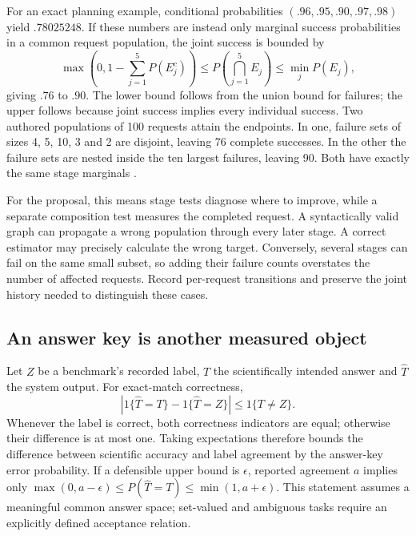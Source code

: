 For an exact planning example, conditional probabilities
$(.96,.95,.90,.97,.98)$ yield $.78025248$. If these numbers are instead only
marginal success probabilities in a common request population, the joint
success is bounded by
\begin{equation}
 \max\!\left(0,1-\sum_{j=1}^5P(E_j^c)\right)
 \leq P\!\left(\bigcap_{j=1}^5 E_j\right)
 \leq\min_jP(E_j),
 \label{exec13:frontier-frechet}
\end{equation}
giving $.76$ to $.90$. The lower bound follows from the union bound for
failures; the upper follows because joint success implies every individual
success. Two authored populations of 100 requests attain the endpoints. In
one, failure sets of sizes 4, 5, 10, 3 and 2 are disjoint, leaving 76 complete
successes. In the other the failure sets are nested inside the ten largest
failures, leaving 90. Both have exactly the same stage marginals
\citep{exec13_frontier_exact}.

For the proposal, this means stage tests diagnose where to improve, while a
separate composition test measures the completed request. A syntactically
valid graph can propagate a wrong population through every later stage. A
correct estimator may precisely calculate the wrong target. Conversely,
several stages can fail on the same small subset, so adding their failure
counts overstates the number of affected requests. Record per-request
transitions and preserve the joint history needed to distinguish these cases.

\subsection{An answer key is another measured object}

Let $Z$ be a benchmark's recorded label, $T$ the scientifically intended answer
and $\widehat T$ the system output. For exact-match correctness,
\begin{equation}
 \left|1\{\widehat T=T\}-1\{\widehat T=Z\}\right|
 \leq1\{T\ne Z\}.
 \label{exec13:frontier-oracle}
\end{equation}
Whenever the label is correct, both correctness indicators are equal;
otherwise their difference is at most one. Taking expectations therefore
bounds the difference between scientific accuracy and label agreement by the
answer-key error probability. If a defensible upper bound is $\epsilon$,
reported agreement $a$ implies only
$\max(0,a-\epsilon)\leq P(\widehat T=T)\leq\min(1,a+\epsilon)$.
This statement assumes a meaningful common answer space; set-valued and
ambiguous tasks require an explicitly defined acceptance relation.

